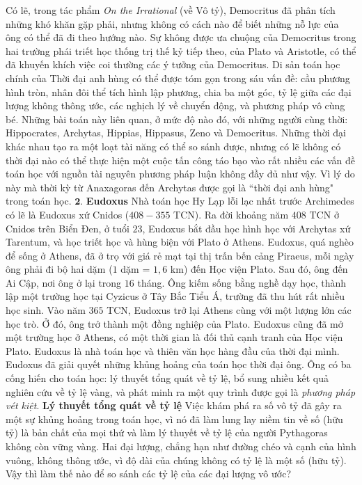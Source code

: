 \begin{multicols}{2}
	\vskip 0.1cm
	Có lẽ, trong tác phẩm \textit{On the Irrational} (về Vô tỷ), Democritus đã phân tích những khó khăn gặp phải, nhưng không có cách nào để biết những nỗ lực của ông có thể đã đi theo hướng nào.
	\vskip 0.1cm
	Sự không được ưa chuộng của Democritus trong hai trường phái triết học thống trị thế kỷ tiếp theo, của Plato và Aristotle, có thể đã khuyến khích việc coi thường các ý tưởng của Democritus. 
	\vskip 0.1cm
	Di sản toán học chính của Thời đại anh hùng có thể được tóm gọn trong sáu vấn đề: cầu phương hình tròn, nhân đôi thể tích hình lập phương, chia ba một góc, tỷ lệ giữa các đại lượng không thông ước, các nghịch lý về chuyển động, và phương pháp vô cùng bé. 
	\vskip 0.1cm
	Những bài toán này liên quan, ở mức độ nào đó, với những người cùng thời: Hippocrates, Archytas, Hippias, Hippasus, Zeno và Democritus. 
	\vskip 0.1cm
	Những thời đại khác nhau tạo ra một loạt tài năng có thể so sánh được, nhưng có lẽ không có thời đại nào có thể thực hiện một cuộc tấn công táo bạo vào rất nhiều các vấn đề toán học với nguồn tài nguyên phương pháp luận không đầy đủ như vậy. Vì lý do này mà thời kỳ từ Anaxagoras đến Archytas được gọi là ``thời đại anh hùng" trong toán học.
	\vskip 0.1cm
	$\pmb{2.}$ \textbf{\color{lichsutoanhoc}Eudoxus}
	\vskip 0.1cm
	 Nhà toán học Hy Lạp lỗi lạc nhất trước Archimedes có lẽ là Eudoxus xứ Cnidos ($408 - 355$ TCN).
	 \vskip 0.1cm
	Ra đời khoảng năm $408$ TCN ở Cnidos trên Biển Đen, ở tuổi $23$, Eudoxus bắt đầu học hình học với Archytas xứ Tarentum, và học triết học và hùng biện với Plato ở Athens. Eudoxus, quá nghèo để sống ở Athens, đã ở trọ với giá rẻ mạt tại thị trấn bến cảng Piraeus, mỗi ngày ông phải đi bộ hai dặm ($1$ dặm = $1{,}6$ km) đến Học viện Plato. Sau đó, ông đến Ai Cập, nơi ông ở lại trong $16$ tháng. Ông kiếm sống bằng nghề dạy học, thành lập một trường học tại Cyzicus ở Tây Bắc Tiểu Á, trường đã thu hút rất nhiều học sinh. Vào năm $365$ TCN, Eudoxus trở lại Athens cùng với một lượng lớn các học trò. Ở đó, ông trở thành một đồng nghiệp của Plato.
	Eudoxus cũng đã mở một trường học ở Athens, có một thời gian là đối thủ cạnh tranh của Học viện Plato.
	\vskip 0.1cm
	Eudoxus là nhà toán học và thiên văn học hàng đầu của thời đại mình. Eudoxus đã giải quyết những khủng hoảng của toán học thời đại ông. Ông có ba cống hiến cho toán học: lý thuyết tổng quát về tỷ lệ, bổ sung nhiều kết quả nghiên cứu về tỷ lệ vàng, và phát minh ra một quy trình được gọi là \textit{phương pháp vét kiệt}.
	\vskip 0.1cm 
	\textbf{\color{lichsutoanhoc}Lý thuyết tổng quát về tỷ lệ} 
	\vskip 0.1cm
	Việc khám phá ra số vô tỷ đã gây ra một sự khủng hoảng trong toán học, vì nó đã làm lung lay niềm tin về số (hữu tỷ) là bản chất của mọi thứ và làm lý thuyết về tỷ lệ của người Pythagoras không còn vững vàng. Hai đại lượng, chẳng hạn như đường chéo và cạnh của hình vuông, không thông ước, vì độ dài của chúng không có tỷ lệ là một số (hữu tỷ). Vậy thì làm thế nào để so sánh các tỷ lệ của các đại lượng vô ước?

\end{multicols}
